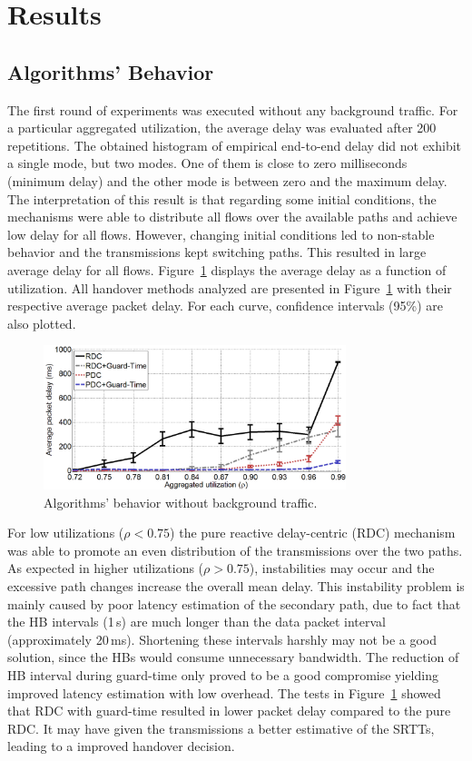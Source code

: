 \documentclass{sbrt2015}
\begin{document}
\section{Results}
\subsection{Algorithms' Behavior}
The first round of experiments was executed without any background traffic. For a particular aggregated utilization, the average delay was evaluated after 200 repetitions. The obtained histogram of empirical end-to-end delay did not exhibit a single mode, but two modes. One of them is close to zero milliseconds (minimum delay) and the other mode is between zero and the maximum delay. The interpretation of this result is that regarding some initial conditions, the mechanisms were able to distribute all flows over the available paths and achieve low delay for all flows. However, changing initial conditions led to non-stable behavior and the transmissions kept switching paths. This resulted in large average delay for all flows. Figure~\ref{figura2} displays the average delay as a function of utilization. All handover methods analyzed are presented in Figure~\ref{figura2} with their respective average packet delay. For each curve, confidence intervals (95\%) are also plotted.

\begin{figure}[h!]
\centering
\includegraphics[width=8.8cm,height=4.2cm]{figura2}
\caption{Algorithms' behavior without background traffic.}
\label{figura2}
\end{figure}

For low utilizations ($\rho < 0.75$) the pure reactive delay-centric (RDC) mechanism was able to promote an even distribution of the transmissions over the two paths. As expected in higher utilizations ($\rho > 0.75$), instabilities may occur and the excessive path changes increase the overall mean delay. This instability problem is mainly caused by poor latency estimation of the secondary path, due to fact that the HB intervals (1\,s) are much longer than the data packet interval (approximately 20\,ms). Shortening these intervals harshly may not be a good solution, since the HBs would consume unnecessary bandwidth. The reduction of HB interval during guard-time only proved to be a good compromise yielding improved latency estimation with low overhead. 
The tests in Figure~\ref{figura2} showed that RDC with guard-time resulted in lower packet delay compared to the pure RDC. It may have given the transmissions a better estimative of the SRTTs, leading to a improved handover decision.
\end{document}
